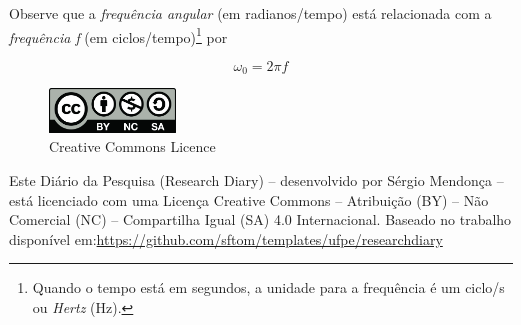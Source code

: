\documentclass[11pt,a4paper]{article}
\begin{document}
Observe que a \textit{frequência angular} (em radianos/tempo) está relacionada com a \textit{frequência f} (em ciclos/tempo)\footnote{Quando o tempo está em segundos, a unidade para a frequência é um ciclo/s ou \textit{Hertz} (Hz).} por

\begin{equation}
	\omega_{0} = 2\pi f
\end{equation}


\newpage
     \begin{figure}[ht]
          \centering
          \caption{\label{fig:by-nc-sa} Creative Commons Licence}
          \includegraphics[width=0.3\textwidth]{img/by-nc-sa.jpg}
      \end{figure} 
      Este Diário da Pesquisa (Research Diary) -- desenvolvido por Sérgio Mendonça -- está licenciado com uma Licença Creative Commons -- Atribuição (BY) -- Não Comercial (NC) -- Compartilha Igual (SA) 4.0 Internacional. Baseado no trabalho disponível em:\newline \href{https://github.com/sftom/ufpe/researchdiary}{https://github.com/sftom/templates/ufpe/researchdiary}
\end{document}
